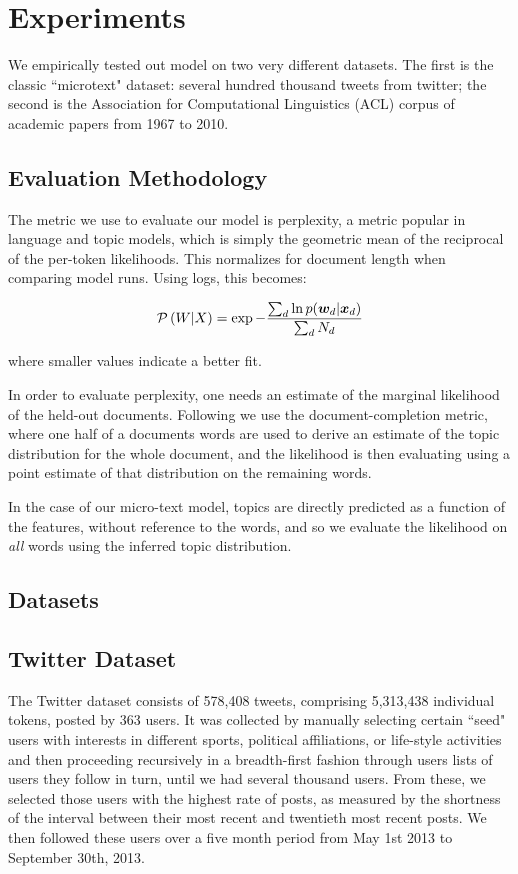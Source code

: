 \section{Experiments}
We empirically tested out model on two very different datasets. The first is the classic ``microtext" dataset: several hundred thousand tweets from twitter; the second is the Association for Computational Linguistics (ACL) corpus of academic papers from 1967 to 2010.

\subsection*{Evaluation Methodology}
The metric we use to evaluate our model is perplexity, a metric popular in language and topic models, which is simply the geometric mean of the reciprocal of the per-token likelihoods. This normalizes for document length when comparing model runs. Using logs, this becomes:

\newcommand \perplx[1] { \mathcal{P} \left( #1 \right) }

\begin{equation}
\perplx{W|X} = \exp - \frac{\sum_d \ln p(\vv{w}_d|\xd)}{\sum_d N_d} \label{eqn:perp_def}
\end{equation}

where smaller values indicate a better fit. 

In order to evaluate perplexity, one needs an estimate of the marginal likelihood of the held-out documents. Following \cite{Asuncion2012}\cite{Wallach2009b} we use the document-completion metric, where one half of a documents words are used to derive an estimate of the topic distribution for the whole document, and the likelihood is then evaluating using a point estimate of that distribution on the remaining words.

In the case of our micro-text model, topics are directly predicted as a function of the features, without reference to the words, and so we evaluate the likelihood on \emph{all} words using the inferred topic distribution.


\subsection{Datasets}
\subsection*{Twitter Dataset}
The Twitter dataset consists of 578,408 tweets, comprising 5,313,438 individual tokens, posted by 363 users. It was collected by manually selecting certain ``seed" users with interests in different sports, political affiliations, or life-style activities and then proceeding recursively in a breadth-first fashion through users lists of users they follow in turn, until we had several thousand users. From these, we selected those users with the highest rate of posts, as measured by the shortness of the interval between their most recent and twentieth most recent posts. We then followed these users over a five month period from May 1st 2013 to September 30th, 2013. 

